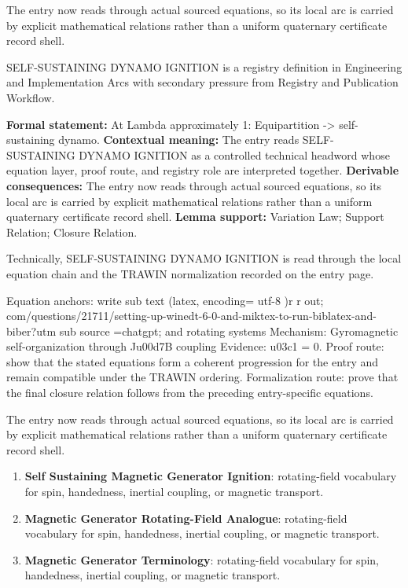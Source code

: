 The entry now reads through actual sourced equations, so its local arc is carried by explicit mathematical relations rather than a uniform quaternary certificate record shell.
\clearpage


\begingroup\small
{}
SELF-SUSTAINING DYNAMO IGNITION is a registry definition in Engineering and Implementation Arcs with secondary pressure from Registry and Publication Workflow.

\begingroup\footnotesize\setlength{\emergencystretch}{3em}\sloppy
\textbf{Formal statement:} At Lambda approximately 1: Equipartition -> self-sustaining dynamo. \textbf{Contextual meaning:} The entry reads SELF-SUSTAINING DYNAMO IGNITION as a controlled technical headword whose equation layer, proof route, and registry role are interpreted together. \textbf{Derivable consequences:} The entry now reads through actual sourced equations, so its local arc is carried by explicit mathematical relations rather than a uniform quaternary certificate record shell. \textbf{Lemma support:} Variation Law; Support Relation; Closure Relation.\par
\endgroup

Technically, SELF-SUSTAINING DYNAMO IGNITION is read through the local equation chain and the TRAWIN normalization recorded on the entry page.

Equation anchors: write sub text (latex, encoding= utf-8 )r r out; com/questions/21711/setting-up-winedt-6-0-and-miktex-to-run-biblatex-and-biber?utm sub source =chatgpt; and rotating systems Mechanism: Gyromagnetic self-organization through Ju00d7B coupling Evidence: u03c1 = 0. Proof route: show that the stated equations form a coherent progression for the entry and remain compatible under the TRAWIN ordering. Formalization route: prove that the final closure relation follows from the preceding entry-specific equations.

The entry now reads through actual sourced equations, so its local arc is carried by explicit mathematical relations rather than a uniform quaternary certificate record shell.
\endgroup

\begin{enumerate}[leftmargin=1.6em,itemsep=6pt,topsep=4pt]
\item \textbf{Self Sustaining Magnetic Generator Ignition}: rotating-field vocabulary for spin, handedness, inertial coupling, or magnetic transport.
\item \textbf{Magnetic Generator Rotating-Field Analogue}: rotating-field vocabulary for spin, handedness, inertial coupling, or magnetic transport.
\item \textbf{Magnetic Generator Terminology}: rotating-field vocabulary for spin, handedness, inertial coupling, or magnetic transport.
\end{enumerate}

